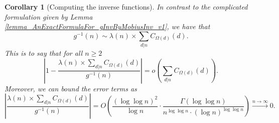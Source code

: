 \documentclass[11pt,reqno,a4letter]{article}
\numberwithin{figure}{section}
\numberwithin{table}{section}
\theoremstyle{plain}
\newtheorem{cor}[theorem]{Corollary}
\numberwithin{theorem}{section}
\theoremstyle{definition}
\begin{document}
\begin{cor}[Computing the inverse functions] 
\label{cor_ComputingInvFuncs_InPractice_DivSumgInvAst1_v1} 
In contrast to the complicated formulation given by 
Lemma \ref{lemma_AnExactFormulaFor_gInvByMobiusInv_v1}, we have that 
\[
g^{-1}(n) \sim \lambda(n) \times \sum_{d|n} C_{\Omega(d)}(d). 
\]
This is to say that for all $n \geq 2$ 
\[
\left\lvert 1 - \frac{\lambda(n) \times \sum_{d|n} C_{\Omega(d)}(d)}{g^{-1}(n)} \right\rvert = 
     o\left(\sum_{d|n} C_{\Omega(d)}(d)\right). 
\]
Moreover, we can bound the error terms as 
\[
\left\lvert \frac{\lambda(n) \times \sum_{d|n} C_{\Omega(d)}(d)}{g^{-1}(n)} \right\rvert = 
     O\left(\frac{(\log\log n)^2}{\log n} \cdot 
     \frac{\Gamma(\log\log n)}{ 
     n^{\log\log n} \cdot (\log n)^{\log\log n}}\right) 
     \xrightarrow{n \rightarrow \infty} 0. 
\]
\end{cor} 
\end{document}
